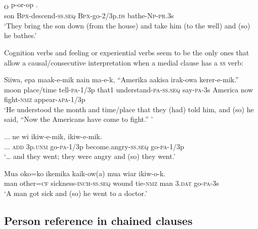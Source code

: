 \ea%
\label{ex:8:x1504}
\textsubscript{O}  p-or-op   . \\
son \textsc{Bpx}-descend-\textsc{ss}.\textsc{seq} \textsc{Bpx}-go-2/3p.\textsc{ds} bathe-\textsc{Np}-\textsc{pr}.3s\\
\glt`They bring the son down (from the house) and take him (to the well) and (so) he bathes.'
\z


Cognition verbs and feeling or experiential verbs seem to be the only ones that allow a causal/consecutive interpretation when a medial clause has a \textsc{ss} verb:

\ea%
\label{ex:8:x1440}
\gll Siiwa,  epa  maak-e-mik  nain    ma-e-k, ``Amerika  aakisa  irak-owa  kerer-e-mik.''\\
moon  place/time  tell-\textsc{pa}-1/3p that1  understand-\textsc{pa}-\textsc{ss}.\textsc{seq} say-\textsc{pa}-3s America now fight-\textsc{nmz} appear-\textsc{apa}-1/3p\\
\glt`He understood the month and time/place that they (had) told him, and (so) he said, ``Now the Americans have come to fight.'' '
\z
{}


\ea%
\label{ex:8:x1441}
\gll ...  ne  wi  ikiw-e-mik,    ikiw-e-mik. \\
...  \textsc{add} 3p.\textsc{unm} go-\textsc{pa}-1/3p become.angry-\textsc{ss}.\textsc{seq} go-\textsc{pa}-1/3p\\
\glt`{\dots} and they went; they were angry and (so) they went.'
\z


\ea%
\label{ex:8:x1484}
\gll Mua  oko=ko    ikemika  kaik-ow(a)  mua wiar  ikiw-o-k.\\
man  other=\textsc{cf} sickness-\textsc{inch}-\textsc{ss}.\textsc{seq} wound tie-\textsc{nmz} man 3.\textsc{dat} go-\textsc{pa}-3s\\
\glt`A man got sick and (so) he went to a doctor.'
\z


\subsection{Person reference in chained clauses} \label{sec:8.2.3}

